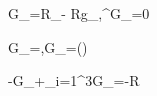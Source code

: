 G_{\mu\nu}=R_{\mu\nu}- Rg_{\mu\nu},\qquad \nabla^\mu G_{\mu\nu}=0

G_{}=,\qquad G_{\hat\imath\hat\imath}=\quad()

-G_{}+\sum_{i=1}^3G_{\hat\imath\hat\imath}=-R
